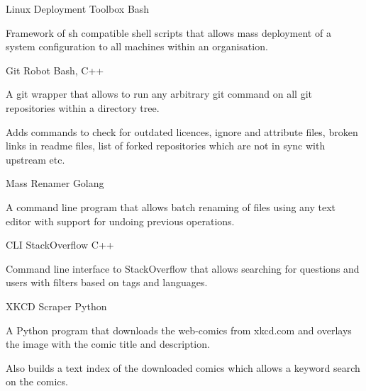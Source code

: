 \begin{projentries}
\projentry%
  {Linux Deployment Toolbox} %
  {Bash} %
  {} %
  {%
    \begin{projitems} %
    \item{Framework of sh compatible shell scripts that allows mass deployment
          of a system configuration to all machines within an organisation.}
    \end{projitems}
  }

\projentry%
  {Git Robot} %
  {Bash, C++} %
  {} %
  {%
    \begin{projitems} %
      \item{A git wrapper that allows to run any arbitrary git command on all
            git repositories within a directory tree.}
      \item{Adds commands to check for outdated licences, ignore and
            attribute files, broken links in readme files, list of forked
            repositories which are not in sync with upstream etc.}
    \end{projitems}
  }

\projentry%
  {Mass Renamer} %
  {Golang} %
  {} %
  {%
    \begin{projitems} %
      \item{A command line program that allows batch renaming of files using any
            text editor with support for undoing previous operations.}
    \end{projitems}
  }

\projentry%
  {CLI StackOverflow} %
  {C++} %
  {} %
  {%
    \begin{projitems} %
      \item{Command line interface to StackOverflow that allows searching for
            questions and users with filters based on tags and languages.}
    \end{projitems}
  }

\projentry%
  {XKCD Scraper} %
  {Python} %
  {} %
  {%
    \begin{projitems} %
      \item{A Python program that downloads the web-comics from xkcd.com and
            overlays the image with the comic title and description.}
      \item{Also builds a text index of the downloaded comics which allows a
            keyword search on the comics.}
    \end{projitems}
  }


\end{projentries}

